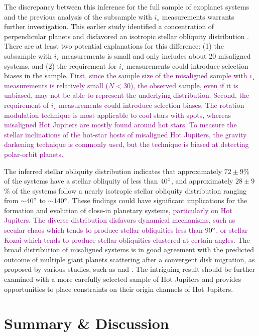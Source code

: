 \documentclass[twocolumn,times]{aastex631}
\newcommand{\edits}[1]{\textcolor{purple}{#1}}
\begin{document}
The discrepancy between this inference for the full sample of exoplanet systems and the previous analysis of the subsample with $i_\star$ measurements \citep{Albrecht21} warrants further investigation.
This earlier study identified a concentration of perpendicular planets and disfavored an isotropic stellar obliquity distribution \citep{Albrecht21}.
There are at least two potential explanations for this difference: (1) the subsample with $i_\star$ measurements is small and only includes about 20 misaligned systems, and (2) the requirement for $i_\star$ measurements could introduce selection biases in the sample. 
\edits{First, since the sample size of the misaligned sample with $i_\star$ measurements is relatively small ($N < 30$), the observed sample, even if it is unbiased, may not be able to represent the underlying distribution.
Second, the requirement of $i_\star$ measurements could introduce selection biases. The rotation modulation technique is most applicable to cool stars with spots, whereas misaligned Hot Jupiters are mostly found around hot stars. To measure the stellar inclinations of the hot-star hosts of misaligned Hot Jupiters, the gravity darkening technique is commonly used, but the technique is biased at detecting polar-orbit planets.}

The inferred stellar obliquity distribution indicates that approximately $72\pm9$\% of the systems have a stellar obliquity of less than $40\mbox{$^\circ$}$, and approximately $28\pm9$\% of the systems follow a nearly isotropic stellar obliquity distribution ranging from $\sim$$40\mbox{$^\circ$}$ to $\sim$$140\mbox{$^\circ$}$. These findings could have significant implications for the formation and evolution of close-in planetary systems, \edits{particularly on Hot Jupiters. The diverse distribution disfavors dynamical mechanisms, such as secular chaos which tends to produce stellar obliquities less than $90\mbox{$^\circ$}$, or stellar Kozai which tends to produce stellar obliquities clustered at certain angles.}
The broad distribution of misaligned systems is in good agreement with the predicted outcome of multiple giant planets scattering after a convergent disk migration, as proposed by various studies, such as \cite{Nagasawa11} and \cite{Beague12}. The intriguing result should be further examined with a more carefully selected sample of Hot Jupiters and provides opportunities to place constraints on their origin channels of Hot Jupiters.

\section{Summary \& Discussion}
\end{document}
